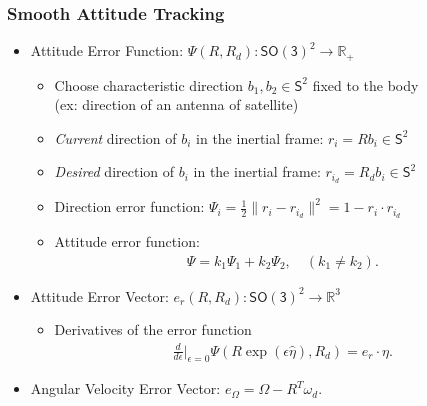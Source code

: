 \documentclass[11pt,professionalfonts,hyperref={pdftex,pdfpagemode=none,pdfstartview=FitH}]{beamer}
\newcommand{\SO}{\ensuremath{\mathsf{SO(3)}}}
\renewcommand{\Re}{\ensuremath{\mathbb{R}}}
\newcommand{\Sph}{\ensuremath{\mathsf{S}}}
\begin{document}
\begin{frame}
\frametitle{Smooth Attitude Tracking}

\begin{itemize}
\item Attitude Error Function: {\small $\Psi(R,R_d):\SO^2\rightarrow \Re_+$}
\begin{itemize}
\item Choose characteristic direction $b_1,b_2\in\Sph^2$ fixed to the body\\
(ex: direction of an antenna of satellite)
\item \textit{Current} direction of $b_i$ in the inertial frame: $r_i = R b_i\in\Sph^2$
\item \textit{Desired} direction of $b_i$ in the inertial frame: $r_{i_d} = R_d b_i\in\Sph^2$
\item Direction error function: $\Psi_i=\frac{1}{2}\|r_i-r_{i_d}\|^2=1- r_i \cdot r_{i_d}$
\item Attitude error function:
\begin{gather*}
\Psi = k_1 \Psi_1 + k_2 \Psi_2,\quad (k_1\neq k_2).
\end{gather*}
\end{itemize}
\pause\vspace*{0.1cm}
\item Attitude Error Vector: {\small $e_r(R,R_d):\SO^2\rightarrow \Re^3$}
	\begin{itemize}
	\item Derivatives of the error function
	\begin{align*}
	\frac{d}{d\epsilon}\bigg|_{\epsilon=0} \Psi(R\exp(\epsilon\hat\eta),R_d) = e_r\cdot \eta.%
	\end{align*}
	\end{itemize}
	\vspace*{0.1cm}
\pause	
\item Angular Velocity Error Vector: $e_\Omega=\Omega- R^T\omega_d$.	
\end{itemize}
\end{frame}
\end{document}
